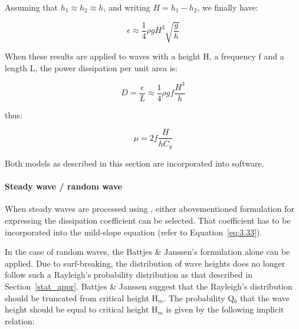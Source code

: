 \begin{itemize}
Assuming that $h_{1} \approx h_{2} \approx h$, and writing $H=h_{1}-h_{2}$, we finally have:

\begin{equation}
  \epsilon \approx \frac{1}{4}\rho g H^{3}\sqrt{\frac{g}{h}}
  \label{eq:3.44}
\end{equation}

When these results are applied to waves with a height H, a frequency f and a
length L, the power dissipation per unit area is:

\begin{equation}
  D = \frac{\epsilon}{L} \approx \frac{1}{4}\rho gf \frac{H^{3}}{h}
  \label{eq:3.45}
\end{equation}

thus:

\begin{equation}
  \mu = 2f\frac{H}{hC_{g}}
  \label{eq:3.46}
\end{equation}
\end{itemize}

Both models as described in this section are incorporated into \artemis{} software.

\paragraph{Steady wave / random wave}\label{steady_rand_wave}

When steady waves are processed using \artemis{}, either abovementioned
formulation for expressing the dissipation coefficient can be selected. That
coefficient has to be incorporated into the mild-slope equation (refer to
Equation~\eqref{eq:3.33}).

In the case of random waves, the Battjes \& Janssen's formulation alone can be
applied. Due to surf-breaking, the distribution of wave heights does no longer
follow such a Rayleigh's probability distribution as that described in
Section~\ref{stat_appr}. Battjes \& Janssen \cite{Battjes1978} suggest that the Rayleigh's
distribution should be truncated from critical height H${}_{m}$. The
probability Q${}_{b}$ that the wave height should be equal to critical height
H${}_{m}$ is given by the following implicit relation:

